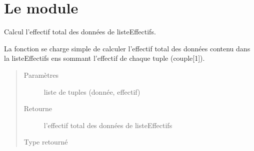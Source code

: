 \documentclass[letterpaper,10pt,french]{sphinxmanual}
\begin{document}
\section{Le module }
\label{\detokenize{addQualitatives:le-module-analyse-de-donnees-qualitatives}}

\begin{fulllineitems}
\label{\detokenize{addQualitatives:add.addQualitatives.nbElemListeCouple}}
Calcul l’effectif total des données de listeEffectifs.

La fonction se charge simple de calculer l’effectif total des données contenu dans la listeEffectifs ens sommant 
l’effectif de chaque tuple (couple{[}1{]}).
\begin{quote}\begin{description}
\item[{Paramètres}] \leavevmode
{} \textendash{} liste de tuples (donnée, effectif)

\item[{Retourne}] \leavevmode
l’effectif total des données de listeEffectifs

\item[{Type retourné}] \leavevmode
{}

\end{description}\end{quote}

\end{fulllineitems}

\end{document}
